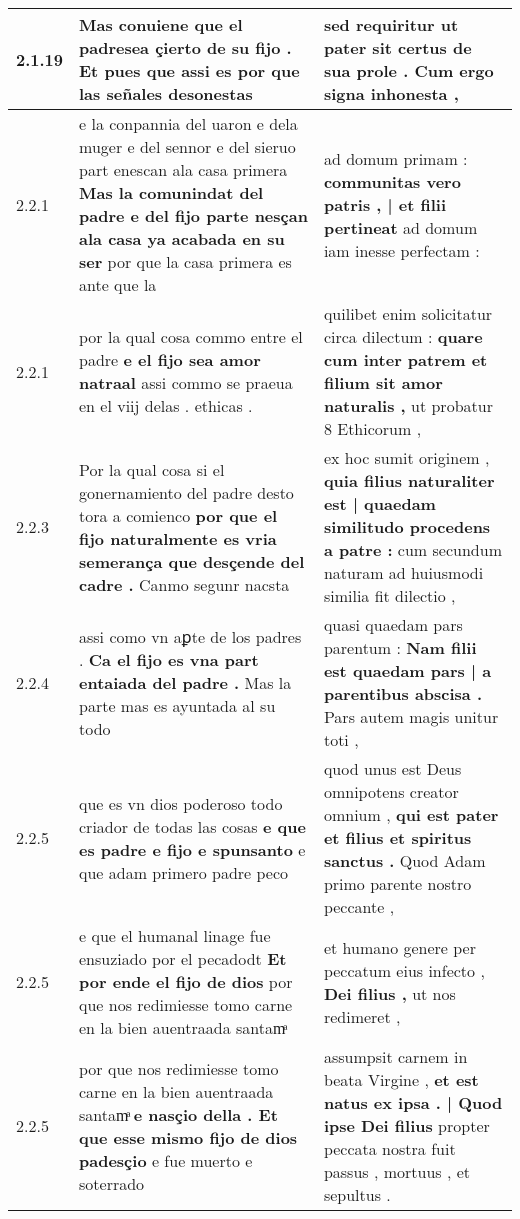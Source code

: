 \begin{tabular}{|p{1cm}|p{6.5cm}|p{6.5cm}|}
2.1.19 & Mas conuiene que el \textbf{ padresea çierto de su fijo . } Et pues que assi es por que las señales desonestas & sed requiritur \textbf{ ut pater sit certus de sua prole . } Cum ergo signa inhonesta , \\\hline
2.2.1 & e la conpannia del uaron e dela muger e del sennor e del sieruo part enescan ala casa primera \textbf{ Mas la comunindat del padre e del fijo parte nesçan ala casa ya acabada en su ser } por que la casa primera es ante que la & ad domum primam : \textbf{ communitas vero patris , | et filii pertineat } ad domum iam inesse perfectam : \\\hline
2.2.1 & por la qual cosa commo entre el padre \textbf{ e el fijo sea amor natraal } assi commo se praeua en el viij delas . ethicas . & quilibet enim solicitatur circa dilectum : \textbf{ quare cum inter patrem et filium sit amor naturalis , } ut probatur 8 Ethicorum , \\\hline
2.2.3 & Por la qual cosa si el gonernamiento del padre desto tora a comienco \textbf{ por que el fijo naturalmente es vria semerança que desçende del cadre . } Canmo segunr nacsta & ex hoc sumit originem , \textbf{ quia filius naturaliter est | quaedam similitudo procedens a patre : } cum secundum naturam ad huiusmodi similia fit dilectio , \\\hline
2.2.4 & assi como vn aꝑte de los padres . \textbf{ Ca el fijo es vna part entaiada del padre . } Mas la parte mas es ayuntada al su todo & quasi quaedam pars parentum : \textbf{ Nam filii est quaedam pars | a parentibus abscisa . } Pars autem magis unitur toti , \\\hline
2.2.5 & que es vn dios poderoso todo criador de todas las cosas \textbf{ e que es padre e fijo e spunsanto } e que adam primero padre peco & quod unus est Deus omnipotens creator omnium , \textbf{ qui est pater et filius et spiritus sanctus . } Quod Adam primo parente nostro peccante , \\\hline
2.2.5 & e que el humanal linage fue ensuziado por el pecadodt \textbf{ Et por ende el fijo de dios } por que nos redimiesse tomo carne en la bien auentraada santamͣ & et humano genere per peccatum eius infecto , \textbf{ Dei filius , } ut nos redimeret , \\\hline
2.2.5 & por que nos redimiesse tomo carne en la bien auentraada santamͣ \textbf{ e nasçio della . Et que esse mismo fijo de dios padesçio } e fue muerto e soterrado & assumpsit carnem in beata Virgine , \textbf{ et est natus ex ipsa . | Quod ipse Dei filius } propter peccata nostra fuit passus , mortuus , et sepultus . \\\hline

\end{tabular}
